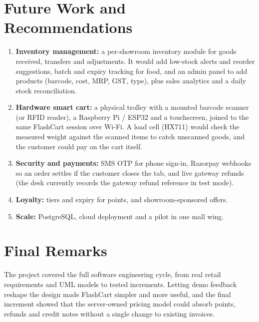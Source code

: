 \documentclass[12pt,letterpaper,twoside,openany]{report}
\begin{document}
\section{Future Work and Recommendations}
\begin{enumerate}[leftmargin=*]
  \item \textbf{Inventory management:} a per-showroom inventory module for goods received,
        transfers and adjustments. It would add low-stock alerts and reorder suggestions,
        batch and expiry tracking for food, and an admin panel to add products (barcode, cost,
        MRP, GST, type), plus sales analytics and a daily stock reconciliation.
  \item \textbf{Hardware smart cart:} a physical trolley with a mounted barcode scanner (or
        RFID reader), a Raspberry Pi / ESP32 and a touchscreen, joined to the same FlashCart
        session over Wi-Fi. A load cell (HX711) would check the measured weight against the
        scanned items to catch unscanned goods, and the customer could pay on the cart itself.
  \item \textbf{Security and payments:} SMS OTP for phone sign-in, Razorpay webhooks so an
        order settles if the customer closes the tab, and live gateway refunds (the desk
        currently records the gateway refund reference in test mode).
  \item \textbf{Loyalty:} tiers and expiry for points, and showroom-sponsored offers.
  \item \textbf{Scale:} PostgreSQL, cloud deployment and a pilot in one mall wing.
\end{enumerate}

\section{Final Remarks}
The project covered the full software engineering cycle, from real retail requirements and UML
models to tested increments. Letting demo feedback reshape the design made FlashCart simpler
and more useful, and the final increment showed that the server-owned pricing model could
absorb points, refunds and credit notes without a single change to existing invoices.
\end{document}
